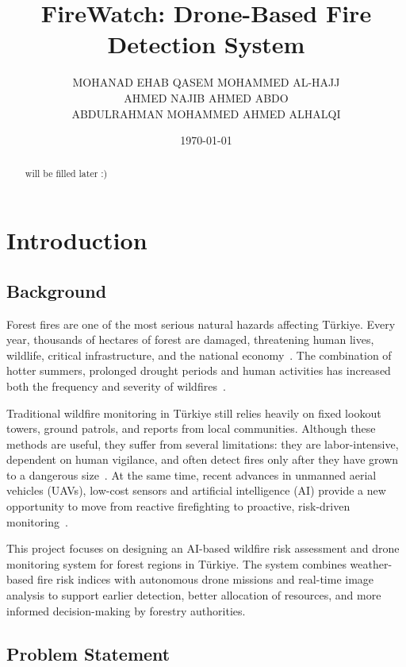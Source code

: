 \documentclass[11pt,a4paper]{report}
\title{\textbf{FireWatch: Drone-Based Fire Detection System}}
\author{
  MOHANAD EHAB QASEM MOHAMMED AL-HAJJ \\
  AHMED NAJIB AHMED ABDO \\
  ABDULRAHMAN MOHAMMED AHMED ALHALQI
}
\date{\today}
\begin{document}
\maketitle

\begin{abstract}
{ will be filled later :) }
\end{abstract}

\tableofcontents
\clearpage

\chapter{Introduction}

\section{Background}

Forest fires are one of the most serious natural hazards affecting Türkiye. Every year, thousands of hectares of forest are damaged, threatening human lives, wildlife, critical infrastructure, and the national economy~\cite{colak2020}. The combination of hotter summers, prolonged drought periods and human activities has increased both the frequency and severity of wildfires~\cite{goltas2024,ekberzade2025}.

Traditional wildfire monitoring in Türkiye still relies heavily on fixed lookout towers, ground patrols, and reports from local communities. Although these methods are useful, they suffer from several limitations: they are labor-intensive, dependent on human vigilance, and often detect fires only after they have grown to a dangerous size~\cite{bugaric2025}. At the same time, recent advances in unmanned aerial vehicles (UAVs), low-cost sensors and artificial intelligence (AI) provide a new opportunity to move from reactive firefighting to proactive, risk-driven monitoring~\cite{mohapatra2022}.

This project focuses on designing an AI-based wildfire risk assessment and drone monitoring system for forest regions in Türkiye. The system combines weather-based fire risk indices with autonomous drone missions and real-time image analysis to support earlier detection, better allocation of resources, and more informed decision-making by forestry authorities.

\section{Problem Statement}
\end{document}
